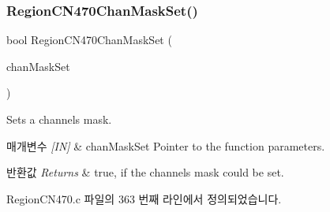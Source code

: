\subsubsection{\texorpdfstring{Region\+C\+N470\+Chan\+Mask\+Set()}{RegionCN470ChanMaskSet()}}
{\footnotesize\ttfamily bool Region\+C\+N470\+Chan\+Mask\+Set (\begin{DoxyParamCaption}\item[{\mbox{\hyperlink{group___r_e_g_i_o_n_ga6d24f7da136006410827dfb29f6b9b9e}{Chan\+Mask\+Set\+Params\+\_\+t}} $\ast$}]{chan\+Mask\+Set }\end{DoxyParamCaption})}



Sets a channels mask. 


\begin{DoxyParams}{매개변수}
{\em \mbox{[}\+I\+N\mbox{]}} & chan\+Mask\+Set Pointer to the function parameters.\\
\hline
\end{DoxyParams}

\begin{DoxyRetVals}{반환값}
{\em Returns} & true, if the channels mask could be set. \\
\hline
\end{DoxyRetVals}


Region\+C\+N470.\+c 파일의 363 번째 라인에서 정의되었습니다.


